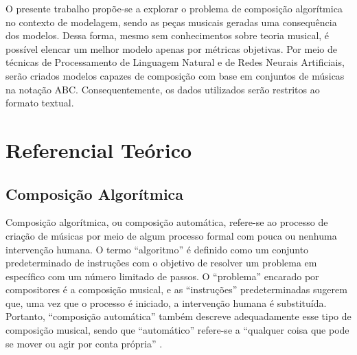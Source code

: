 \documentclass{automatextcc}
\newcommand{\pumi}[1]{\textcolor{red}{#1}}
\begin{document}
O presente trabalho propõe-se a explorar o problema de composição algorítmica no contexto de modelagem, sendo as peças musicais geradas uma consequência dos modelos. Dessa forma, mesmo sem conhecimentos sobre teoria musical, é possível elencar um melhor modelo apenas por métricas objetivas. Por meio de técnicas de Processamento de Linguagem Natural e de Redes Neurais Artificiais, serão criados modelos capazes de composição com base em conjuntos de músicas na notação ABC. Consequentemente, os dados utilizados serão restritos ao formato textual. 

%



\chapter{Referencial Teórico}


\section{Composição Algorítmica}
Composição algorítmica, ou composição automática, refere-se ao processo de criação de músicas por meio de algum processo formal com pouca ou nenhuma intervenção humana. O termo ``algoritmo'' é definido como um conjunto predeterminado de instruções com o objetivo de resolver um problema em específico com um número limitado de passos. O ``problema'' encarado por compositores é a composição musical, e as ``instruções'' predeterminadas sugerem que, uma vez que o processo é iniciado, a intervenção humana é substituída. Portanto, ``composição automática'' também descreve adequadamente esse tipo de composição musical, sendo que ``automático'' refere-se a ``qualquer coisa que pode se mover ou agir por conta própria'' \citep{alpern1995, maurer}.
\end{document}
